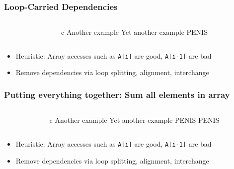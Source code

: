 \documentclass[handout]{beamer}
\begin{document}
\begin{frame}[fragile]
  \frametitle{Loop-Carried Dependencies}
  \begin{columns}[t]%
    \begin{column}{0.65\textwidth}
    \end{column}
    \pause
    \begin{column}{0.4\textwidth}
      \begin{ccode}[]
        {c}
        Another example
        Yet another example
        PENIS

      \end{ccode}
    \end{column}
  \end{columns}
  \pause
  \begin{itemize}
  \item Heuristic: Array accesses such as \texttt{A[i]} are good, \texttt{A[i-1]} are bad
  \item Remove dependencies via loop splitting, alignment, interchange
  \end{itemize}
\end{frame}

\begin{frame}[fragile]
  \frametitle{Putting everything together: Sum all elements in array}
  \begin{columns}[t]%
    \begin{column}{0.65\textwidth}
    \end{column}
    \pause
    \begin{column}{0.4\textwidth}
      \begin{ccode}[]
        {c}
        Another example
        Yet another example
        PENIS
        PENIS
      \end{ccode}
    \end{column}
  \end{columns}
  \pause
  \begin{itemize}
  \item Heuristic: Array accesses such as \texttt{A[i]} are good, \texttt{A[i-1]} are bad
  \item Remove dependencies via loop splitting, alignment, interchange
  \end{itemize}
\end{frame}
\end{document}
